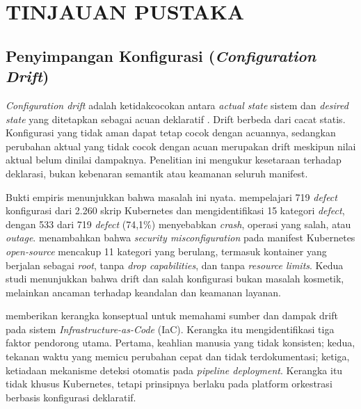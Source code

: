 \chapter{TINJAUAN PUSTAKA}

\section{Penyimpangan Konfigurasi (\textit{Configuration Drift})}

\textit{Configuration drift} adalah ketidakcocokan antara \textit{actual state} sistem dan \textit{desired state} yang ditetapkan sebagai acuan deklaratif \citep{pohjola2025mitigating}. Drift berbeda dari cacat statis. Konfigurasi yang tidak aman dapat tetap cocok dengan acuannya, sedangkan perubahan aktual yang tidak cocok dengan acuan merupakan drift meskipun nilai aktual belum dinilai dampaknya. Penelitian ini mengukur kesetaraan terhadap deklarasi, bukan kebenaran semantik atau keamanan seluruh manifest.

Bukti empiris menunjukkan bahwa masalah ini nyata. \citet{zhang2026configuration} mempelajari 719 \textit{defect} konfigurasi dari 2.260 skrip Kubernetes dan mengidentifikasi 15 kategori \textit{defect}, dengan 533 dari 719 \textit{defect} (74,1\%) menyebabkan \textit{crash}, operasi yang salah, atau \textit{outage}. \citet{rahman2023security} menambahkan bahwa \textit{security misconfiguration} pada manifest Kubernetes \textit{open-source} mencakup 11 kategori yang berulang, termasuk kontainer yang berjalan sebagai \textit{root}, tanpa \textit{drop capabilities}, dan tanpa \textit{resource limits}. Kedua studi menunjukkan bahwa drift dan salah konfigurasi bukan masalah kosmetik, melainkan ancaman terhadap keandalan dan keamanan layanan.

\citet{pohjola2025mitigating} memberikan kerangka konseptual untuk memahami sumber dan dampak drift pada sistem \textit{Infrastructure-as-Code} (IaC). Kerangka itu mengidentifikasi tiga faktor pendorong utama. Pertama, keahlian manusia yang tidak konsisten; kedua, tekanan waktu yang memicu perubahan cepat dan tidak terdokumentasi; ketiga, ketiadaan mekanisme deteksi otomatis pada \textit{pipeline deployment}. Kerangka itu tidak khusus Kubernetes, tetapi prinsipnya berlaku pada platform orkestrasi berbasis konfigurasi deklaratif.

